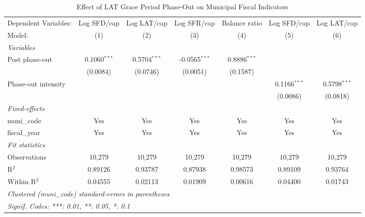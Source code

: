 
\begin{table}[htbp]
   \caption{\label{tab:main_did} Effect of LAT Grace Period Phase-Out on Municipal Fiscal Indicators}
   \centering
   \begin{adjustbox}{max width=\textwidth}
   \begin{tabular}{lcccccc}
      \tabularnewline \midrule \midrule
      Dependent Variables: & Log SFD/cap    & Log LAT/cap    & Log SFR/cap     & Balance ratio  & Log SFD/cap    & Log LAT/cap\\  
      Model:               & (1)            & (2)            & (3)             & (4)            & (5)            & (6)\\  
      \midrule
      \emph{Variables}\\
      Post phase-out       & 0.1060$^{***}$ & 0.5704$^{***}$ & -0.0565$^{***}$ & 0.8886$^{***}$ &                &   \\   
                           & (0.0084)       & (0.0746)       & (0.0051)        & (0.1587)       &                &   \\   
      Phase-out intensity  &                &                &                 &                & 0.1166$^{***}$ & 0.5798$^{***}$\\   
                           &                &                &                 &                & (0.0086)       & (0.0818)\\   
      \midrule
      \emph{Fixed-effects}\\
      muni\_code           & Yes            & Yes            & Yes             & Yes            & Yes            & Yes\\  
      fiscal\_year         & Yes            & Yes            & Yes             & Yes            & Yes            & Yes\\  
      \midrule
      \emph{Fit statistics}\\
      Observations         & 10,279         & 10,279         & 10,279          & 10,279         & 10,279         & 10,279\\  
      R$^2$                & 0.89126        & 0.93787        & 0.87938         & 0.98573        & 0.89109        & 0.93764\\  
      Within R$^2$         & 0.04555        & 0.02113        & 0.01909         & 0.00616        & 0.04400        & 0.01743\\  
      \midrule \midrule
      \multicolumn{7}{l}{\emph{Clustered (muni\_code) standard-errors in parentheses}}\\
      \multicolumn{7}{l}{\emph{Signif. Codes: ***: 0.01, **: 0.05, *: 0.1}}\\
   \end{tabular}
   \end{adjustbox}
\end{table}


